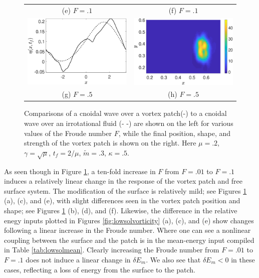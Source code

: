 \documentclass[a4paper,11pt]{article}
\begin{document}
\begin{figure}
\begin{tabular}{cc}
(e)  $F=.1$ & (f)  $F=.1$\\
\includegraphics[width=.35\textwidth]{profiles_wm_50_modu_pt3} & \includegraphics[width=.35\textwidth]{vorticity_wm_50_modu_pt3}\\
(g)  $F=.5$ & (h)  $F=.5$
\end{tabular}
\caption{Comparisons of a cnoidal wave over a vortex patch(-) to a cnoidal wave over an irrotational fluid (- -) are shown on the left for various values of the Froude number $F$, while the final position, shape, and strength of the vortex patch is shown on the right.  Here $\mu=.2$, $\gamma=\sqrt{\mu}$, $t_{f}=2/\mu$, $\tilde{m}=.3$, $\kappa = .5$.}
\label{fig:lowsolwave}
\end{figure}

As seen though in Figure \ref{fig:lowsolwave}, a ten-fold increase in $F$ from $F=.01$ to $F=.1$ induces a relatively linear change in the response of the vortex patch and free surface system.  The modification of the surface is relatively mild; see Figures \ref{fig:lowsolwave} (a), (c), and (e), with slight differences seen in the vortex patch position and shape; see Figures \ref{fig:lowsolwave} (b), (d), and (f).  Likewise, the difference in the relative enegy inputs plotted in Figures \ref{fig:lowsolvorticity} (a), (c), and (e) show changes following a linear increase in the Froude number.  Where one can see a nonlinear coupling between the surface and the patch is in the mean-energy input compiled in Table \ref{tab:lowsolmean}.  Clearly increasing the Froude number from $F=.01$ to $F=.1$ does not induce a linear change in $\delta E_{m}$.  We also see that $\delta E_{m}<0$ in these cases, reflecting a loss of energy from the surface to the patch.  
\end{document}
